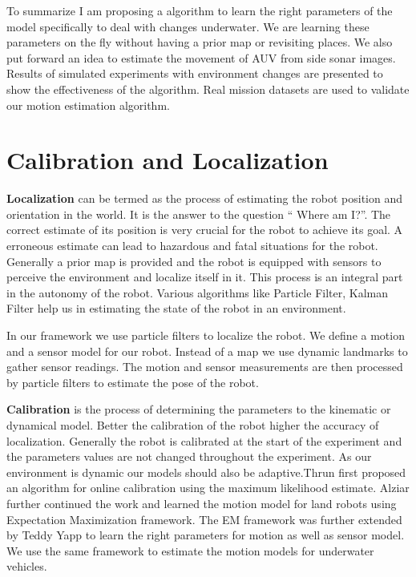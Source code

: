 \documentclass[12pt]{dalcsthesis}
\begin{document}
To summarize I am proposing a algorithm to learn the right parameters of the model specifically to deal with changes underwater. We are learning these parameters on the fly without having a prior map or revisiting places. We also put forward an idea to estimate the movement of AUV from side sonar images. Results of simulated experiments with environment changes are presented to show the effectiveness of the algorithm. Real mission datasets are used to validate our motion estimation algorithm. 
\section{Calibration and Localization}
\textbf{Localization} can be termed as the process of estimating the robot position and orientation in the world. It is the answer to the question “ Where am I?”. The correct estimate of its position is very crucial for the robot to achieve its goal. A erroneous estimate can lead to hazardous and fatal situations for the robot. Generally a prior map is provided and the robot is equipped with sensors to perceive the environment and localize itself in it. This process is an integral part in the autonomy of the robot. Various algorithms like Particle Filter, Kalman Filter help us in estimating the state of the robot in an environment. 

In our framework we use particle filters to localize the robot. We define a motion and a sensor model for our robot. Instead of a map we use dynamic landmarks to gather sensor readings. The motion and sensor measurements are then processed by particle filters to estimate the pose of the robot. 

\textbf{Calibration} is the process of determining the parameters to the kinematic or dynamical model. Better the calibration of the robot higher the accuracy of localization. Generally the robot is calibrated at the start of the experiment and the parameters values are not changed throughout the experiment. As our environment is dynamic our models should also be adaptive.Thrun first proposed an algorithm for online calibration using the maximum likelihood estimate. Alziar further continued the work and learned the motion model for land robots using Expectation Maximization framework. The EM framework was further extended by Teddy Yapp to learn the right parameters for motion as well as sensor model. We use the same framework to estimate the motion models for underwater vehicles.%
\end{document}
